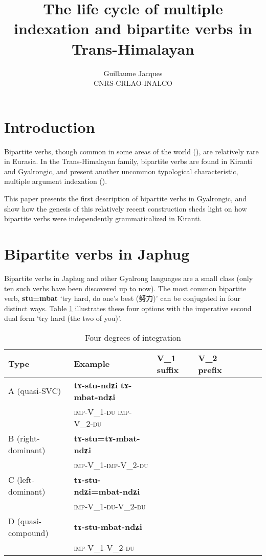 \documentclass[oneside,a4paper,11pt]{article}
\newcommand{\ipa}[1]{{\phon\textbf{#1}}}
\newcommand{\zh}[1]{{\cn #1}}
\newcommand{\Y}{\Checkmark}
\newcommand{\N}{}
\newcommand{\jpg}[2]{\ipa{#1} `#2'}
\begin{document}
 
\title{The life cycle of multiple indexation and bipartite verbs in Trans-Himalayan}
\author{Guillaume Jacques\\ CNRS-CRLAO-INALCO}
\maketitle



 \section*{Introduction}
Bipartite verbs, though common in some areas of the world (\citealt{delancey96bipartite}), are relatively rare in Eurasia. In the Trans-Himalayan family, bipartite verbs are found in Kiranti and Gyalrongic, and present another uncommon typological characteristic, 
multiple argument indexation (\citealt{denk15multiple}).

This paper presents the first description of bipartite verbs in Gyalrongic, and show how the genesis of this relatively recent construction sheds light on how bipartite verbs were independently grammaticalized in Kiranti.



\section{Bipartite verbs in Japhug} \label{sec:japhug.bipart}

Bipartite verbs in Japhug and other Gyalrong languages are a small class (only ten such verbs have been discovered up to now). 
The most common bipartite verb, \jpg{stu=mbat}{try hard, do one's best (\zh{努力})} can be conjugated in four distinct ways. Table \ref{tab:four} illustrates these four options with the imperative second dual form `try hard (the two of you)'.


\begin{table}[H]
\caption{Four degrees of integration} \centering \label{tab:four}
\begin{tabular}{lllllll}
\toprule
Type & Example & V_1 suffix & V_2 prefix \\
\midrule
A (quasi-SVC) & \ipa{tɤ-stu-ndʑi} \ipa{tɤ-mbat-ndʑi} &\Y &\Y \\
 &\textsc{imp}-V_1-\textsc{du}  \textsc{imp}-V_2-\textsc{du} \\
B (right-dominant) & \ipa{tɤ-stu=tɤ-mbat-ndʑi} &\N  &\Y \\
 &\textsc{imp}-V_1-\textsc{imp}-V_2-\textsc{du} \\
C (left-dominant) & \ipa{tɤ-stu-ndʑi=mbat-ndʑi} &\Y  &\N \\
 &\textsc{imp}-V_1-\textsc{du}-V_2-\textsc{du} \\
D (quasi-compound)& \ipa{tɤ-stu-mbat-ndʑi} &\N  &\N \\
 &\textsc{imp}-V_1-V_2-\textsc{du} \\
\bottomrule
\end{tabular}
\end{table}
\end{document}
